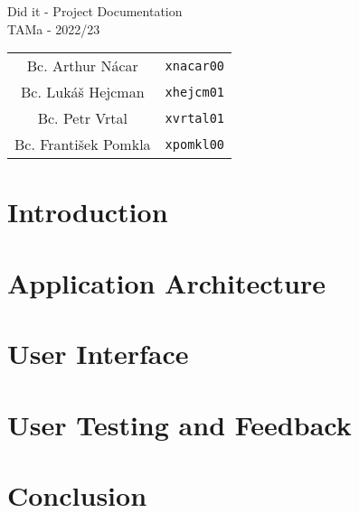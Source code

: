 \documentclass[11pt, a4paper]{report}
\begin{document}
\begin{titlepage}

\end{titlepage}

\newpage
\thispagestyle{empty}

\begin{center}
    \Huge{Did it - Project Documentation}\\
    \vspace{10pt}
    \LARGE{TAMa - 2022/23}\\
    \vspace{400pt}
    \begin{tabular}{cc}
        Bc. Arthur Nácar     & \texttt{xnacar00} \\
        Bc. Lukáš Hejcman    & \texttt{xhejcm01} \\
        Bc. Petr Vrtal       & \texttt{xvrtal01} \\
        Bc. František Pomkla & \texttt{xpomkl00} \\
    \end{tabular}
\end{center}

\newpage

\chapter{Introduction}
\chapter{Application Architecture}
\chapter{User Interface}
\chapter{User Testing and Feedback}
\chapter{Conclusion}
\end{document}
